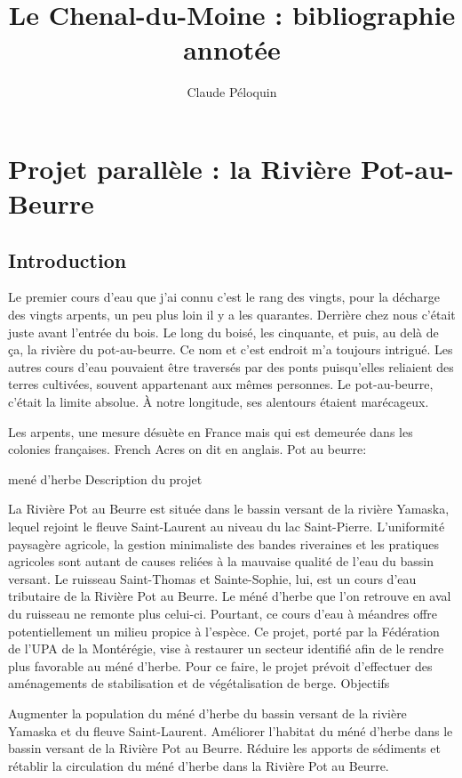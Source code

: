 \documentclass[12pt]{report}
\title{Le Chenal-du-Moine : bibliographie annotée}
\author{Claude Péloquin}
\date{}
\begin{document}
\chapter*{Projet parallèle : la Rivière Pot-au-Beurre}

\maketitle
\section{Introduction}

Le premier cours d'eau que j'ai connu c'est le rang des vingts, pour la décharge des vingts arpents, un peu plus loin il y a les quarantes. Derrière chez nous c'était juste avant l'entrée du bois. Le long du boisé, les cinquante, et puis, au delà de ça, la rivière du pot-au-beurre. Ce nom et c'est endroit m'a toujours intrigué. Les autres cours d'eau pouvaient être traversés par des ponts puisqu'elles reliaient des terres cultivées, souvent appartenant aux mêmes personnes. Le pot-au-beurre, c'était la limite absolue. À notre longitude, ses alentours étaient marécageux. 

Les arpents, une mesure désuète en France mais qui est demeurée dans les colonies françaises. \og French Acres \fg on dit en anglais.
Pot au beurre: 

mené d'herbe
Description du projet

La Rivière Pot au Beurre est située dans le bassin versant de la rivière Yamaska, lequel rejoint le fleuve Saint-Laurent au niveau du lac Saint-Pierre. L’uniformité paysagère agricole, la gestion minimaliste des bandes riveraines et les pratiques agricoles sont autant de causes reliées à la mauvaise qualité de l’eau du bassin versant. Le ruisseau Saint-Thomas et Sainte-Sophie, lui, est un cours d’eau tributaire de la Rivière Pot au Beurre. Le méné d’herbe que l’on retrouve en aval du ruisseau ne remonte plus celui-ci. Pourtant, ce cours d’eau à méandres offre potentiellement un milieu propice à l’espèce. Ce projet, porté par la Fédération de l’UPA de la Montérégie, vise à restaurer un secteur identifié afin de le rendre plus favorable au méné d’herbe. Pour ce faire, le projet prévoit d’effectuer des aménagements de stabilisation et de végétalisation de berge.
Objectifs 

    Augmenter la population du méné d’herbe du bassin versant de la rivière Yamaska et du fleuve Saint-Laurent.
    Améliorer l’habitat du méné d’herbe dans le bassin versant de la Rivière Pot au Beurre.
    Réduire les apports de sédiments et rétablir la circulation du méné d’herbe dans la Rivière Pot au Beurre.
\end{document}
